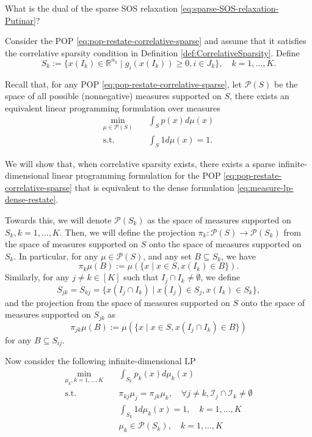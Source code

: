 \documentclass[
]{book}
\theoremstyle{definition}
\theoremstyle{definition}
\theoremstyle{definition}
\theoremstyle{definition}
\theoremstyle{remark}
\begin{document}
What is the dual of the sparse SOS relaxation \eqref{eq:sparse-SOS-relaxation-Putinar}?

Consider the POP \eqref{eq:pop-restate-correlative-sparse} and assume that it satisfies the correlative sparsity condition in Definition \ref{def:CorrelativeSparsity}. Define
\begin{equation}
S_k := \{ x(I_k) \in \mathbb{R}^{n_k} \mid g_i(x(I_k)) \geq 0, i \in J_k \}, \quad k=1,\dots,K.
\label{eq:projected-subset}
\end{equation}

Recall that, for any POP \eqref{eq:pop-restate-correlative-sparse}, let \(\mathcal{P}(S)\) be the space of all possible (nonnegative) measures supported on \(S\), there exists an equivalent linear programming formulation over measures
\begin{equation}
\begin{split}
\min_{\mu \in \mathcal{P}(S)} & \quad \int_{S} p(x) d \mu(x) \\
\mathrm{s.t.}& \quad \int_S 1 d\mu(x) = 1.
\end{split}
\label{eq:measure-lp-dense-restate}
\end{equation}

We will show that, when correlative sparsity exists, there exists a sparse infinite-dimensional linear programming formulation for the POP \eqref{eq:pop-restate-correlative-sparse} that is equivalent to the dense formulation \eqref{eq:measure-lp-dense-restate}.

Towards this, we will denote \(\mathcal{P}(S_k)\) as the space of measures supported on \(S_k,k=1,\dots,K\). Then, we will define the projection \(\pi_k: \mathcal{P}(S) \rightarrow \mathcal{P}(S_k)\) from the space of measures supported on \(S\) onto the space of measures supported on \(S_k\). In particular, for any \(\mu \in \mathcal{P}(S)\), and any set \(B \subseteq S_k\), we have
\[
\pi_k \mu(B) := \mu \left( \{ x \mid x \in S, x(I_k) \in B \} \right).
\]
Similarly, for any \(j\neq k \in [K]\) such that \(I_j \cap I_k \neq \emptyset\), we define
\[
S_{jk} = S_{kj} = \{  x(I_j \cap I_k) \mid x(I_j) \in S_j, x(I_k) \in S_k \},
\]
and the projection from the space of measures supported on \(S\) onto the space of measures supported on \(S_{jk}\) as
\[
\pi_{jk}\mu(B) := \mu \left( \{ x \mid x \in S, x(I_j \cap I_k) \in B \} \right)
\]
for any \(B \subseteq S_{ij}\).

Now consider the following infinite-dimensional LP
\begin{equation}
\begin{split}
\min_{\mu_k, k=1,\dots,K} & \quad \int_{S_k} p_k(x)  d \mu_k (x) \\
\mathrm{s.t.}& \quad \pi_{kj} \mu_j = \pi_{jk} \mu_k, \quad \forall j \neq k, \mathcal{I}_j \cap \mathcal{I}_k \neq \emptyset \\
& \quad \int_{S_k} 1 d \mu_k(x) = 1, \quad k=1,\dots,K \\
& \quad \mu_k \in \mathcal{P}(S_k), \quad k=1,\dots,K
\end{split}
\label{eq:measure-lp-sparse}
\end{equation}
\end{document}
